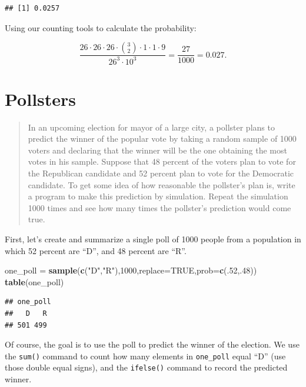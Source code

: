 \documentclass[
]{book}
\newenvironment{Shaded}{\begin{snugshade}}{\end{snugshade}}
\newcommand{\AttributeTok}[1]{\textcolor[rgb]{0.13,0.29,0.53}{#1}}
\newcommand{\ConstantTok}[1]{\textcolor[rgb]{0.56,0.35,0.01}{#1}}
\newcommand{\DecValTok}[1]{\textcolor[rgb]{0.00,0.00,0.81}{#1}}
\newcommand{\FunctionTok}[1]{\textcolor[rgb]{0.13,0.29,0.53}{\textbf{#1}}}
\newcommand{\NormalTok}[1]{#1}
\newcommand{\OtherTok}[1]{\textcolor[rgb]{0.56,0.35,0.01}{#1}}
\newcommand{\StringTok}[1]{\textcolor[rgb]{0.31,0.60,0.02}{#1}}
\theoremstyle{definition}
\theoremstyle{definition}
\theoremstyle{definition}
\theoremstyle{definition}
\theoremstyle{remark}
\begin{document}
\begin{verbatim}
## [1] 0.0257
\end{verbatim}

Using our counting tools to calculate the probability:

\[\frac{26\cdot 26\cdot 26 \cdot \binom{3}{2} \cdot 1 \cdot 1 \cdot 9}{26^3\cdot 10^3}= \frac{27}{1000} = 0.027.\]

\section{Pollsters}\label{pollsters-R}

\begin{quote}
In an upcoming election for mayor of a large city, a pollster plans to predict the winner of the popular vote by taking a random sample of 1000 voters and declaring that the winner will be the one obtaining the most votes in his sample. Suppose that 48 percent of the voters plan to vote for the Republican candidate and 52 percent plan to vote for the Democratic candidate. To get some idea of how reasonable the pollster's plan is, write a program to make this prediction by simulation. Repeat the simulation 1000 times and see how many times the pollster's prediction would come true.
\end{quote}

First, let's create and summarize a single poll of 1000 people from a population in which 52 percent are ``D'', and 48 percent are ``R''.

\begin{Shaded}
\begin{Highlighting}[]
\NormalTok{one\_poll }\OtherTok{=} \FunctionTok{sample}\NormalTok{(}\FunctionTok{c}\NormalTok{(}\StringTok{"D"}\NormalTok{,}\StringTok{"R"}\NormalTok{),}\DecValTok{1000}\NormalTok{,}\AttributeTok{replace=}\ConstantTok{TRUE}\NormalTok{,}\AttributeTok{prob=}\FunctionTok{c}\NormalTok{(.}\DecValTok{52}\NormalTok{,.}\DecValTok{48}\NormalTok{))}
\FunctionTok{table}\NormalTok{(one\_poll)}
\end{Highlighting}
\end{Shaded}

\begin{verbatim}
## one_poll
##   D   R 
## 501 499
\end{verbatim}

Of course, the goal is to use the poll to predict the winner of the election.
We use the \texttt{sum()} command to count how many elements in \texttt{one\_poll} equal ``D'' (use those double equal signs), and the \texttt{ifelse()} command to record the predicted winner.
\end{document}
